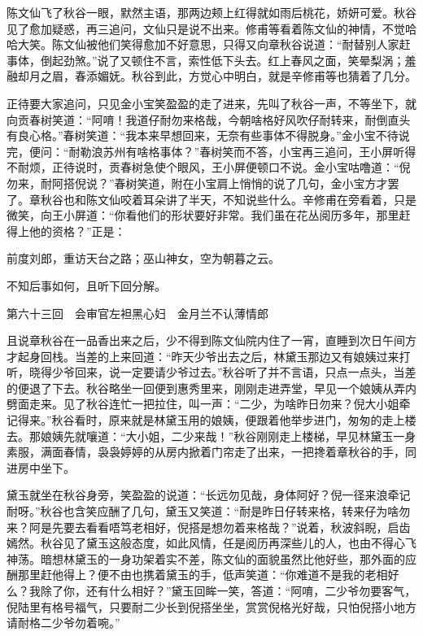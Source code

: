 \documentclass[12pt,UTF8]{ctexbook}
\begin{document}
{{{陈文仙飞了秋谷一眼，默然主语，那两边颊上红得就如雨后桃花，娇妍可爱。秋谷见了愈加疑惑，再三追问，文仙只是说不出来。修甫等看着陈文仙的神情，不觉哈哈大笑。陈文仙被他们笑得愈加不好意思，只得又向章秋谷说道：“耐替别人家赶事体，倒起劲煞。”说了又顿住不言，索性低下头去。红上春风之面，笑晕梨涡；羞融却月之眉，春添媚妩。秋谷到此，方觉心中明白，就是辛修甫等也猜着了几分。

正待要大家追问，只见金小宝笑盈盈的走了进来，先叫了秋谷一声，不等坐下，就向贡春树笑道：“阿唷！我道仔耐勿来格哉，今朝啥格好风吹仔耐转来，耐倒直头有良心格。”春树笑道：“我本来早想回来，无奈有些事体不得脱身。”金小宝不待说完，便问：“耐勒浪苏州有啥格事体？”春树笑而不答，小宝再三追问，王小屏听得不耐烦，正待说时，贡春树急使个眼风，王小屏便顿口不说。金小宝咕噜道：“倪勿来，耐阿搭倪说？”春树笑道，附在小宝肩上悄悄的说了几句，金小宝方才罢了。章秋谷也和陈文仙咬着耳朵讲了半天，不知说些什么。辛修甫在旁看着，只是微笑，向王小屏道：“你看他们的形状要好非常。我们虽在花丛阅历多年，那里赶得上他的资格？”正是：

前度刘郎，重访天台之路；巫山神女，空为朝暮之云。

不知后事如何，且听下回分解。





第六十三回　会审官左袒黑心妇　金月兰不认薄情郎





且说章秋谷在一品香出来之后，少不得到陈文仙院内住了一宵，直睡到次日午间方才起身回栈。当差的上来回道：“昨天少爷出去之后，林黛玉那边又有娘姨过来打听，晓得少爷回来，说一定要请少爷过去。”秋谷听了并不言语，只点一点头，当差的便退了下去。秋谷略坐一回便到惠秀里来，刚刚走进弄堂，早见一个娘姨从弄内劈面走来。见了秋谷连忙一把拉住，叫一声：“二少，为啥昨日勿来？倪大小姐牵记得来。”秋谷看时，原来就是林黛玉用的娘姨，便跟着他举步进门，匆匆的走上楼去。那娘姨先就嚷道：“大小姐，二少来哉！”秋谷刚刚走上楼梯，早见林黛玉一身素服，满面春情，袅袅婷婷的从房内掀着门帘走了出来，一把搀着章秋谷的手，同进房中坐下。

黛玉就坐在秋谷身旁，笑盈盈的说道：“长远勿见哉，身体阿好？倪一径来浪牵记耐呀。”秋谷也含笑应酬了几句，黛玉又笑道：“耐是昨日仔转来格，转来仔为啥勿来？阿是先要去看看唔笃老相好，倪搭是想勿着来格哉？”说着，秋波斜睨，启齿嫣然。秋谷见了黛玉这般态度，如此风情，任是阅历再深些儿的人，也由不得心飞神荡。暗想林黛玉的一身功架着实不差，陈文仙的面貌虽然比他好些，那外面的应酬那里赶他得上？便不由也携着黛玉的手，低声笑道：“你难道不是我的老相好么？我除了你，还有什么相好？”黛玉回眸一笑，答道：“阿唷，二少爷勿要客气，倪陆里有格号福气，只要耐二少长到倪搭坐坐，赏赏倪格光好哉，只怕倪搭小地方请耐格二少爷勿着啘。”

}}}
\end{document}
